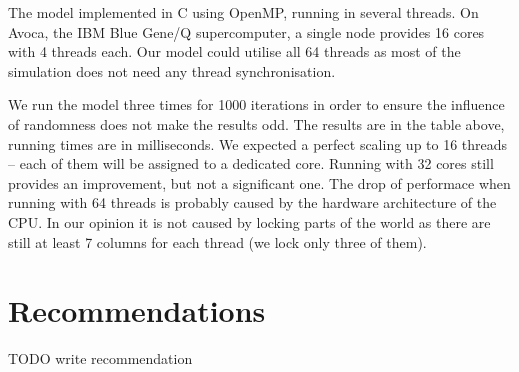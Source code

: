 \documentclass[a4paper]{article}
\begin{document}
The model implemented in C using OpenMP, running in several threads.
On Avoca, the IBM Blue Gene/Q supercomputer, a single node provides 16 cores with 4 threads each.
Our model could utilise all 64 threads as most of the simulation does not need any thread synchronisation.

We run the model three times for 1000 iterations in order to ensure the influence of randomness does not make the results odd.
The results are in the table above, running times are in milliseconds.
We expected a perfect scaling up to 16 threads -- each of them will be assigned to a dedicated core.
Running with 32 cores still provides an improvement, but not a significant one.
The drop of performace when running with 64 threads is probably caused by the hardware architecture of the CPU.
In our opinion it is not caused by locking parts of the world as there are still at least 7 columns for each thread (we lock only three of them).

\section{Recommendations}

TODO write recommendation


\begingroup
\raggedright



\endgroup
\end{document}
